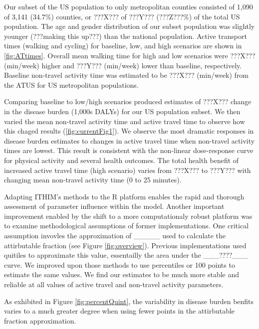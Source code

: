 Our subset of the US population to only metropolitan counties consisted of 1,090 of 3,141 (34.7\%) counties, or ???X??? of ???Y??? (???Z???\%) of the total US population. The age and gender distribution of our subset population was slightly younger (???making this up???) than the national population. Active transport times (walking and cycling) for baseline, low, and high scenarios are shown in \ref{fig:ATtimes}. Overall mean walking time for high and low scenarios were ???X??? (min/week) higher and ???Y??? (min/week) lower than baseline, respectively. Baseline non-travel activity time was estimated to be ???X??? (min/week) from the ATUS for US metropolitan populations.  

Comparing baseline to low/high scenarios produced estimates of ???X??? change in the disease burden (1,000s DALYs) for our US population subset. We then varied the mean non-travel activity time and active travel time to observe how this chaged results (\ref{fig:currentFig1}). We observe the most dramatic responses in disease burden estimates to changes in active travel time when non-travel activity times are lowest. This result is consistent with the non-linear dose-response curve for physical activity and several health outcomes. The total health benefit of increased active travel time (high scenario) varies from ???X??? to ???Y??? with changing mean non-travel activity time (0 to 25 minutes). 

Adapting ITHIM's methods to the R platform enables the rapid and thorough assessment of parameter influence within the model. Another important improvement enabled by the shift to a more computationaly robust platform was to examine methodological assumptions of former implementations. One critical assumption invovles the approximation of _____ used to calculate the attirbutable fraction (see Figure \ref{fig:overview}). Previous implementations used quitiles to approximate this value, essentailly the area under the ___????___ curve. We improved upon those methods to use percentiles or 100 points to estimate the same values. We find our estimates to be much more stable and reliable at all values of active travel and non-travel activity parameters.

As exhibited in Figure \ref{fig:percentQuint}, the variability in disease burden benfits varies to a much greater degree when using fewer points in the attirbutable fraction approximation. 

